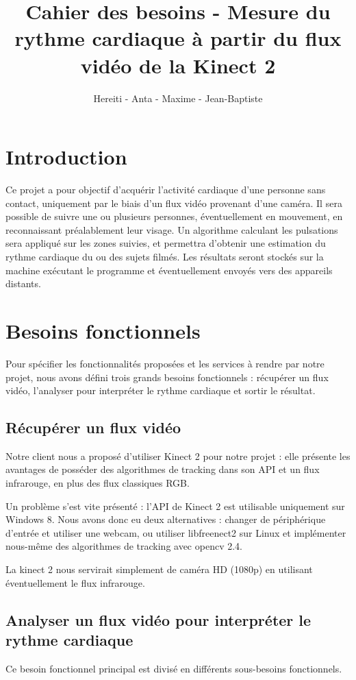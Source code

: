 \documentclass[12pt,a4paper]{article}
\title{Cahier des besoins - Mesure du rythme cardiaque à partir du flux vidéo de la Kinect 2}
\author{Hereiti \bsc{Hatitio} - Anta \bsc{Mbaye} - Maxime \bsc{Vincent} - Jean-Baptiste \bsc{Rey}}
\begin{document}
\maketitle

\tableofcontents
\newpage

\section*{Introduction}

Ce projet a pour objectif d'acquérir l'activité cardiaque d'une personne sans contact, uniquement par le biais d'un flux vidéo provenant d'une caméra.
Il sera possible de suivre une ou plusieurs personnes, éventuellement en mouvement, en reconnaissant préalablement leur visage. Un algorithme calculant les pulsations sera appliqué sur les zones suivies, et permettra d'obtenir une estimation du rythme cardiaque du ou des sujets filmés. Les résultats seront stockés sur la machine exécutant le programme et éventuellement envoyés vers des appareils distants.  

\section{Besoins fonctionnels}
Pour spécifier les fonctionnalités proposées et les services à rendre par notre projet, nous avons défini trois grands besoins fonctionnels : récupérer un flux vidéo, l'analyser pour interpréter le rythme cardiaque et sortir le résultat.

\subsection{Récupérer un flux vidéo}
Notre client nous a proposé d'utiliser Kinect 2 pour notre projet : elle présente les avantages de posséder des algorithmes de tracking dans son API et un flux infrarouge, en plus des flux classiques RGB.

Un problème s'est vite présenté : l'API de Kinect 2 est utilisable uniquement sur Windows 8. Nous avons donc eu deux alternatives : changer de périphérique d'entrée et utiliser une webcam, ou utiliser libfreenect2 sur Linux et implémenter nous-même des algorithmes de tracking avec opencv 2.4.

La kinect 2 nous servirait simplement de caméra HD (1080p) en utilisant éventuellement le flux infrarouge.

\subsection{Analyser un flux vidéo pour interpréter le rythme cardiaque}
Ce besoin fonctionnel principal est divisé en différents sous-besoins fonctionnels.
\end{document}

